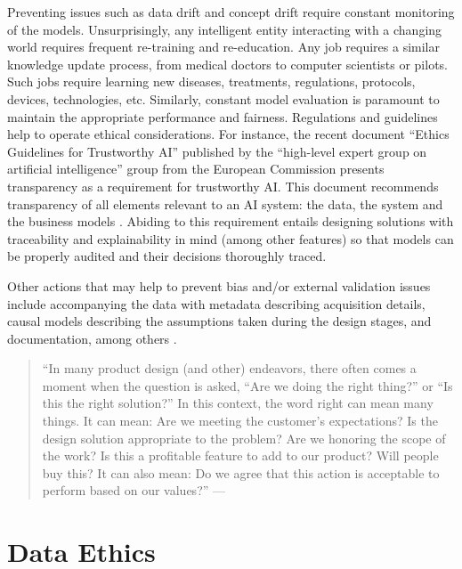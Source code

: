 \documentclass[
]{book}
\begin{document}
Preventing issues such as data drift and concept drift require constant monitoring of the models. Unsurprisingly, any intelligent entity interacting with a changing world requires frequent re-training and re-education. Any job requires a similar knowledge update process, from medical doctors to computer scientists or pilots. Such jobs require learning new diseases, treatments, regulations, protocols, devices, technologies, etc. Similarly, constant model evaluation is paramount to maintain the appropriate performance and fairness. Regulations and guidelines help to operate ethical considerations. For instance, the recent document ``Ethics Guidelines for Trustworthy AI'' published by the ``high-level expert group on artificial intelligence'' group from the European Commission presents transparency as a requirement for trustworthy AI. This document recommends transparency of all elements relevant to an AI system: the data, the system and the business models \citep{ai2019high}. Abiding to this requirement entails designing solutions with traceability and explainability in mind (among other features) so that models can be properly audited and their decisions thoroughly traced.

Other actions that may help to prevent bias and/or external validation issues include accompanying the data with metadata describing acquisition details, causal models describing the assumptions taken during the design stages, and documentation, among others \citep{garcia2021need}.

\begin{quote}
``In many product design (and other) endeavors, there often comes a moment when the question is asked, ``Are we doing the right thing?'' or ``Is this the right solution?'' In this context, the word right can mean many things. It can mean: Are we meeting the customer's expectations? Is the design solution appropriate to the problem? Are we honoring the scope of the work? Is this a profitable feature to add to our product? Will people buy this? It can also mean: Do we agree that this action is acceptable to perform based on our values?'' --- \citep{davis2012ethics}
\end{quote}

\hypertarget{data-ethics}{%
\section{Data Ethics}\label{data-ethics}}
\end{document}
